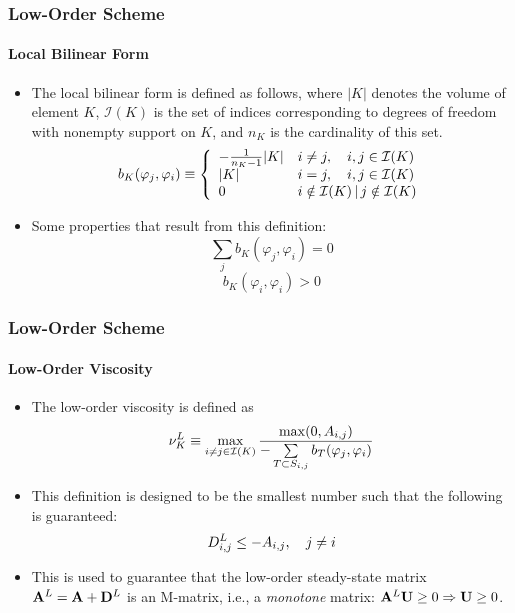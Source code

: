 \documentclass{beamer}
\begin{document}
\begin{frame}
\frametitle{Low-Order Scheme}
\framesubtitle{Local Bilinear Form}

\begin{itemize}
   \item The local bilinear form is defined as follows, where $|K|$ denotes
      the volume of element $K$, $\mathcal{I}(K)$ is the set of indices
      corresponding to degrees of freedom with nonempty support on $K$, and
      $n_K$ is the cardinality of this set.
   \begin{equation}
      b_K(\varphi_j, \varphi_i) \equiv \left\{\begin{array}{l l}
         -\frac{1}{n_K - 1}|K| & i\ne j, \quad i,j\in \mathcal{I}(K)\\
         |K|                   & i = j,  \quad i,j\in \mathcal{I}(K)\\
         0                     & i\notin\mathcal{I}(K)\,|\, j\notin\mathcal{I}(K)
      \end{array}\right.
   \end{equation}
   \item Some properties that result from this definition:
   \begin{equation}
      \sum\limits_j b_K(\varphi_j, \varphi_i) = 0
   \end{equation}
   \begin{equation}
      b_K(\varphi_i, \varphi_i) > 0
   \end{equation}
\end{itemize}

\end{frame}
\begin{frame}
\frametitle{Low-Order Scheme}
\framesubtitle{Low-Order Viscosity}

\begin{itemize}
   \item The low-order viscosity is defined as
   \begin{equation}
      \nu_K^L \equiv \max\limits_{i\ne j\in \mathcal{I}(K)}\frac{\max(0,A_{i,j})}
      {-\sum\limits_{T\subset S_{i,j}} b_T(\varphi_j, \varphi_i)}
   \end{equation}
   \item This definition is designed to be the smallest number such that the
      following is guaranteed:
   \begin{equation}
      D^L_{i,j} \leq -A_{i,j}, \quad j\ne i
   \end{equation}
   \item This is used to guarantee that the low-order steady-state matrix
      $\ssmatrix^L=\ssmatrix+\diffusionmatrix^L$ is an M-matrix, i.e., a \emph{monotone} matrix:
      $\ssmatrix^L\solutionvector \ge 0\Rightarrow \solutionvector\ge 0$.
\end{itemize}

\end{frame}
\end{document}
